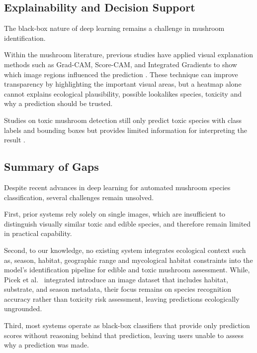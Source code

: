 \documentclass[journal,transmag]{IEEEtran}
\begin{document}
\subsection{\textbf{Explainability and Decision Support}}

The black-box nature of deep learning remains a challenge in mushroom identification.

 Within the mushroom literature, previous studies have applied visual explanation methods such as Grad-CAM, Score-CAM, and Integrated Gradients to show which image regions influenced the prediction \cite{sevindik2025}\cite{korkmaz2025}\cite{ozsari2024}. These technique can improve transparency by highlighting the important visual areas, but a heatmap alone cannot explains ecological plausibility, possible lookalikes species, toxicity and why a prediction should be trusted.

Studies on toxic mushroom detection still only predict toxic species with class labels and bounding boxes but provides limited information for interpreting the result \cite{wei2025pmyolo}.


\subsection{Summary of Gaps}
Despite recent advances in deep learning for automated mushroom species classification, several challenges remain unsolved.

First, prior systems rely solely on single images, which are insufficient to distinguish visually similar toxic and edible species, and therefore remain limited in practical capability\cite{picek2025fungitastic}\cite{kuznetsov2026}. 

Second, to our knowledge, no existing system integrates ecological context such as, season, habitat, geographic range and mycological habitat constraints into the model’s identification pipeline for edible and toxic mushroom assessment. While, Picek 
et al.~\cite{picek2025fungitastic} integrated introduce an image dataset that includes habitat, substrate, and season metadata, their focus remains on species recognition accuracy rather than toxicity risk assessment, leaving predictions ecologically ungrounded\cite{wei2025pmyolo}. 

Third, most systems operate as black-box classifiers that provide only prediction scores without reasoning behind that prediction, leaving users unable to assess why a prediction was made\cite{sevindik2025}\cite{korkmaz2025}\cite{ozsari2024}. 
\end{document}
